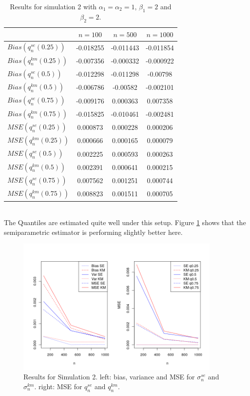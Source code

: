 \begin{table}[h!]
	\begin{center}
		\begin{tabular}{| l || c | c | c |}
			\hline
			&       $n=100$   &    $n=500$    &    $n=1000$\\
			\hline
			\hline
			$Bias(q^{se}_n(0.25)) $ & -0.018255 & -0.011443 & -0.011854\\
			$Bias(q^{km}_n(0.25)) $ & -0.007356 & -0.000332 & -0.000922\\
			\hline
			$Bias(q^{se}_n(0.5)) $ & -0.012298 & -0.011298 & -0.00798\\
			$Bias(q^{km}_n(0.5))$ & -0.006786 & -0.00582 & -0.002101\\
			\hline
			$Bias(q^{se}_n(0.75))$ & -0.009176 & 0.000363 & 0.007358\\
			$Bias(q^{km}_n(0.75))$ & -0.015825 & -0.010461 & -0.002481\\
			\hline
			\hline
			$MSE(q^{se}_n(0.25))$ & 0.000873 & 0.000228 & 0.000206\\
			$MSE(q^{km}_n(0.25))$ & 0.000666 & 0.000165 & 0.000079\\
			\hline
			$MSE(q^{se}_n(0.5))$ & 0.002225 & 0.000593 & 0.000263\\
			$MSE(q^{km}_n(0.5))$ & 0.002391 & 0.000641 & 0.000215\\
			\hline
			$MSE(q^{se}_n(0.75))$ & 0.007562 & 0.001251 & 0.000744\\
			$MSE(q^{km}_n(0.75))$ & 0.008823 & 0.001511 & 0.000705\\
			\hline
		\end{tabular}
	\end{center}
	\caption{Results for simulation 2 with  $\alpha_1 = \alpha_2 = 1$, $\beta_1 = 2$ and $\beta_2 = 2$.}
	\label{tab:res_weiwei2}
\end{table}\\
%
The Quantiles are estimated quite well under this setup. Figure \ref{fig:mse_weiwei} shows that the semiparametric estimator is performing slightly better here.
\begin{figure}[h]
	\begin{center}
		\includegraphics[width=0.9\textwidth]{./figures/weiwei_mse2}
	\end{center}
	\caption{Results for Simulation 2. left: bias, variance and MSE for $\sigma_n^{se}$ and $\sigma_n^{km}$. right: MSE for $q_n^{se}$ and $q_n^{km}$.}
	\label{fig:mse_weiwei}
\end{figure}
%
%
%
